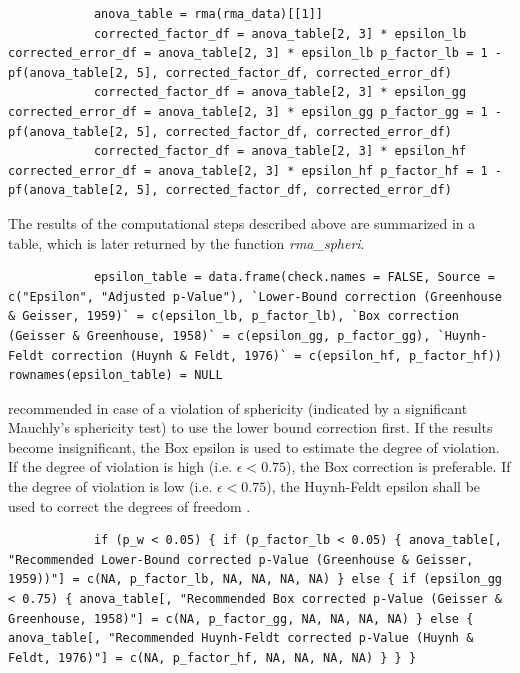 \documentclass[11pt]{article}
\begin{document}
		\begin{lstlisting}
			anova_table = rma(rma_data)[[1]]
			corrected_factor_df = anova_table[2, 3] * epsilon_lb corrected_error_df = anova_table[2, 3] * epsilon_lb p_factor_lb = 1 - pf(anova_table[2, 5], corrected_factor_df, corrected_error_df)
			corrected_factor_df = anova_table[2, 3] * epsilon_gg corrected_error_df = anova_table[2, 3] * epsilon_gg p_factor_gg = 1 - pf(anova_table[2, 5], corrected_factor_df, corrected_error_df)
			corrected_factor_df = anova_table[2, 3] * epsilon_hf corrected_error_df = anova_table[2, 3] * epsilon_hf p_factor_hf = 1 - pf(anova_table[2, 5], corrected_factor_df, corrected_error_df)
		\end{lstlisting}
		
		The results of the computational steps described above are summarized in a table, which is later returned by the function \textit{rma_spheri}.
		
		\begin{lstlisting}
			epsilon_table = data.frame(check.names = FALSE, Source = c("Epsilon", "Adjusted p-Value"), `Lower-Bound correction (Greenhouse & Geisser, 1959)` = c(epsilon_lb, p_factor_lb), `Box correction (Geisser & Greenhouse, 1958)` = c(epsilon_gg, p_factor_gg), `Huynh-Feldt correction (Huynh & Feldt, 1976)` = c(epsilon_hf, p_factor_hf)) rownames(epsilon_table) = NULL
		\end{lstlisting}
		
		\cite{greenhouse1959methods} recommended in case of a violation of sphericity (indicated by a significant Mauchly's sphericity test) to use the lower bound correction first. If the results become insignificant, the Box epsilon is used to estimate the degree of violation. If the degree of violation is high (i.e. $\epsilon < 0.75$), the Box correction is preferable. If the degree of violation is low (i.e. $\epsilon < 0.75$), the Huynh-Feldt epsilon shall be used to correct the degrees of freedom \cite{girden1992anova}.
		
		\begin{lstlisting}
			if (p_w < 0.05) { if (p_factor_lb < 0.05) { anova_table[, "Recommended Lower-Bound corrected p-Value (Greenhouse & Geisser, 1959))"] = c(NA, p_factor_lb, NA, NA, NA, NA) } else { if (epsilon_gg < 0.75) { anova_table[, "Recommended Box corrected p-Value (Geisser & Greenhouse, 1958)"] = c(NA, p_factor_gg, NA, NA, NA, NA) } else { anova_table[, "Recommended Huynh-Feldt corrected p-Value (Huynh & Feldt, 1976)"] = c(NA, p_factor_hf, NA, NA, NA, NA) } } }	
		\end{lstlisting}
\end{document}
